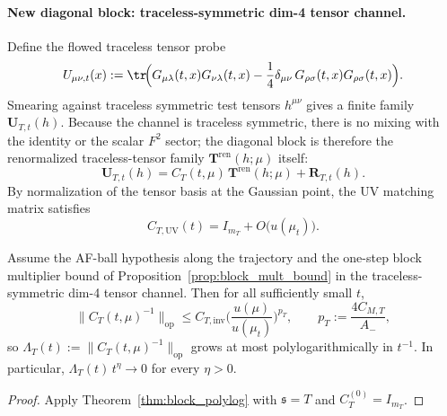 \paragraph{New diagonal block: traceless-symmetric dim-4 tensor channel.}
Define the flowed traceless tensor probe
\[
U_{\mu\nu,t}(x)
:=
\tr\!\Big(
G_{\mu\lambda}(t,x)G_{\nu\lambda}(t,x)
-\frac14\delta_{\mu\nu}\,G_{\rho\sigma}(t,x)G_{\rho\sigma}(t,x)
\Big).
\]
Smearing against traceless symmetric test tensors $h^{\mu\nu}$ gives a finite family $\mathbf U_{T,t}(h)$.
Because the channel is traceless symmetric, there is no mixing with the identity or the scalar $F^2$ sector;
the diagonal block is therefore the renormalized traceless-tensor family $\mathbf T^{\mathrm{ren}}(h;\mu)$ itself:
\[
\mathbf U_{T,t}(h)
=
C_T(t,\mu)\,\mathbf T^{\mathrm{ren}}(h;\mu)+\mathbf R_{T,t}(h).
\]
By normalization of the tensor basis at the Gaussian point, the UV matching matrix satisfies
\[
C_{T,\mathrm{UV}}(t)=I_{m_T}+O\!\big(u(\mu_t)\big).
\]

\begin{theorem}\label{thm:cT_block}
Assume the AF-ball hypothesis along the trajectory and the one-step block multiplier bound of
Proposition~\ref{prop:block_mult_bound} in the traceless-symmetric dim-4 tensor channel.
Then for all sufficiently small $t$,
\begin{equation}\label{eq:cT_polylog}
\|C_T(t,\mu)^{-1}\|_{\mathrm{op}}
\le
C_{T,\mathrm{inv}}
\Big(\frac{u(\mu)}{u(\mu_t)}\Big)^{p_T},
\qquad
p_T:=\frac{4C_{M,T}}{A_-},
\end{equation}
so $\Lambda_T(t):=\|C_T(t,\mu)^{-1}\|_{\mathrm{op}}$ grows at most polylogarithmically in $t^{-1}$.
In particular, $\Lambda_T(t)\,t^\eta\to 0$ for every $\eta>0$.
\end{theorem}

\begin{proof}
Apply Theorem~\ref{thm:block_polylog} with $\mathfrak s=T$ and $C_T^{(0)}=I_{m_T}$.
\end{proof}

